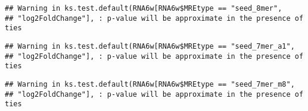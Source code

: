 \documentclass[
]{article}
\newenvironment{Shaded}{\begin{snugshade}}{\end{snugshade}}
\newcommand{\FunctionTok}[1]{\textcolor[rgb]{0.13,0.29,0.53}{\textbf{#1}}}
\newcommand{\NormalTok}[1]{#1}
\newcommand{\OtherTok}[1]{\textcolor[rgb]{0.56,0.35,0.01}{#1}}
\newcommand{\SpecialCharTok}[1]{\textcolor[rgb]{0.81,0.36,0.00}{\textbf{#1}}}
\newcommand{\StringTok}[1]{\textcolor[rgb]{0.31,0.60,0.02}{#1}}
\begin{document}
\begin{verbatim}
## Warning in ks.test.default(RNA6w[RNA6w$MREtype == "seed_8mer",
## "log2FoldChange"], : p-value will be approximate in the presence of ties
\end{verbatim}

\begin{Shaded}
\end{Shaded}

\begin{verbatim}
## Warning in ks.test.default(RNA6w[RNA6w$MREtype == "seed_7mer_a1",
## "log2FoldChange"], : p-value will be approximate in the presence of ties
\end{verbatim}

\begin{Shaded}
\end{Shaded}

\begin{verbatim}
## Warning in ks.test.default(RNA6w[RNA6w$MREtype == "seed_7mer_m8",
## "log2FoldChange"], : p-value will be approximate in the presence of ties
\end{verbatim}

\begin{Shaded}
\end{Shaded}
\end{document}
